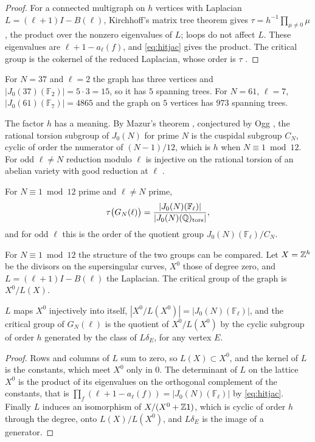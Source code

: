 \begin{proof}
For a connected multigraph on $h$ vertices with Laplacian $L=(\ell+1)I-B(\ell)$, Kirchhoff's matrix tree theorem gives $\tau=h^{-1}\prod_{\mu\ne0}\mu$, the product over the nonzero eigenvalues of $L$; loops do not affect $L$. These eigenvalues are $\ell+1-a_\ell(f)$, and \eqref{eq:hitjac} gives the product. The critical group is the cokernel of the reduced Laplacian, whose order is $\tau$ \cite{biggs1997}.
\end{proof}

For $N=37$ and $\ell=2$ the graph has three vertices and $|J_0(37)(\mathbb F_2)|=5\cdot3=15$, so it has $5$ spanning trees. For $N=61$, $\ell=7$, $|J_0(61)(\mathbb F_7)|=4865$ and the graph on $5$ vertices has $973$ spanning trees.

The factor $h$ has a meaning. By Mazur's theorem \cite{mazur1977}, conjectured by Ogg \cite{ogg1975}, the rational torsion subgroup of $J_0(N)$ for prime $N$ is the cuspidal subgroup $C_N$, cyclic of order the numerator of $(N-1)/12$, which is $h$ when $N\equiv1\bmod12$. For odd $\ell\ne N$ reduction modulo $\ell$ is injective on the rational torsion of an abelian variety with good reduction at $\ell$ \cite{katz1981}.

\begin{corollary}\label{cor:hittorsion}
For $N\equiv1\bmod12$ prime and $\ell\ne N$ prime,
\[
\tau\bigl(G_N(\ell)\bigr)=\frac{|J_0(N)(\mathbb F_\ell)|}{|J_0(N)(\mathbb{Q})_{\mathrm{tors}}|},
\]
and for odd $\ell$ this is the order of the quotient group $J_0(N)(\mathbb F_\ell)/C_N$.
\end{corollary}

For $N\equiv1\bmod12$ the structure of the two groups can be compared. Let $X=\mathbb{Z}^h$ be the divisors on the supersingular curves, $X^0$ those of degree zero, and $L=(\ell+1)I-B(\ell)$ the Laplacian. The critical group of the graph is $X^0/L(X)$.

\begin{proposition}\label{prop:hitcritical}
$L$ maps $X^0$ injectively into itself, $|X^0/L(X^0)|=|J_0(N)(\mathbb F_\ell)|$, and the critical group of $G_N(\ell)$ is the quotient of $X^0/L(X^0)$ by the cyclic subgroup of order $h$ generated by the class of $L\delta_E$, for any vertex $E$.
\end{proposition}

\begin{proof}
Rows and columns of $L$ sum to zero, so $L(X)\subset X^0$, and the kernel of $L$ is the constants, which meet $X^0$ only in $0$. The determinant of $L$ on the lattice $X^0$ is the product of its eigenvalues on the orthogonal complement of the constants, that is $\prod_f(\ell+1-a_\ell(f))=|J_0(N)(\mathbb F_\ell)|$ by \eqref{eq:hitjac}. Finally $L$ induces an isomorphism of $X/(X^0+\mathbb{Z}\mathsf 1)$, which is cyclic of order $h$ through the degree, onto $L(X)/L(X^0)$, and $L\delta_E$ is the image of a generator.
\end{proof}

